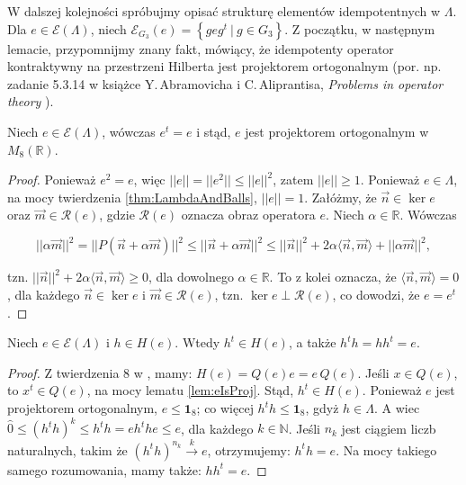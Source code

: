 {W dalszej kolejności spróbujmy opisać strukturę elementów idempotentnych w $\Lambda$.
Dla $e \in \mathcal{E}(\Lambda)$,
niech $\mathcal{E}_{G_{3}}(e) = \left \{ g e g^{t} \: | \: g \in G_{3} \right \}$.
Z początku, w następnym lemacie, przypomnijmy znany fakt,
mówiący, że idempotenty operator kontraktywny na przestrzeni Hilberta
jest projektorem ortogonalnym
(por. np. zadanie 5.3.14 w książce
Y.\,Abramovicha i  C.\,Aliprantisa,
\emph{Problems in operator theory}
\cite{Abramovich2002}).
\begin{Lemma}
    \label{lem:eIsProj}
    Niech $e \in \mathcal{E}(\Lambda)$, wówczas $e^{t} = e$ i stąd,
    $e$ jest projektorem ortogonalnym w $M_{8}(\mathbb{R})$.
\end{Lemma}
\begin{proof}
    Ponieważ $e^{2} = e$, więc $||e|| = ||e^{2}|| \leq ||e||^{2}$,
    zatem $||e|| \geq 1$.
    Ponieważ $e \in \Lambda$, na mocy twierdzenia \ref{thm:LambdaAndBalls},
    $||e|| =1$.
Załóżmy, że $\vec{n} \in \ker e$ oraz $\vec{m} \in \mathcal{R}(e)$,
gdzie $\mathcal{R}(e)$ oznacza obraz operatora $e$.
Niech $\alpha \in \mathbb{R}$.
Wówczas
\begin{linenomath*}
 \begin{equation}
    || \alpha \vec{m} ||^{2} = || P (\vec{n} + \alpha \vec{m}) ||^{2} \leq
    || \vec{n} + \alpha \vec{m}||^{2} \leq ||\vec{n}||^{2} +
        2 \alpha \langle \vec{n}, \vec{m} \rangle + || \alpha \vec{m}||^{2},
 \end{equation}
\end{linenomath*}
tzn. $||\vec{n}||^{2} + 2 \alpha  \langle \vec{n}, \vec{m} \rangle \geq 0$,
dla dowolnego $\alpha \in \mathbb{R}$.
To z kolei oznacza, że
$\langle \vec{n}, \vec{m} \rangle = 0$,
dla każdego  $\vec{n} \in \ker e$ i $\vec{m} \in \mathcal{R}(e)$,
tzn.
$\ker e \perp \mathcal{R}(e)$, co dowodzi, że $e = e^{t}$.
\end{proof}

\begin{Theorem}
\label{prop:htranspose}
Niech $e \in \mathcal{E}(\Lambda)$ i $h \in H(e)$.
Wtedy $h^{t} \in H(e)$, a także $h^{t} h = h h^{t} = e$.
\end{Theorem}
\begin{proof}
    Z twierdzenia 8  w \cite{schwarz1955hausdorff}, mamy:
    $H(e) = Q(e) e = e \, Q(e)$.
Jeśli $x \in Q(e)$, to $x^{t} \in Q(e)$,
na mocy lematu \ref{lem:eIsProj}.
Stąd, $h^{t} \in H(e)$.
Ponieważ $e$ jest projektorem ortogonalnym, $e \leq \mathbf{1}_{8}$;
co więcej $h^{t} h \leq \mathbf{1}_{8}$, gdyż $h \in \Lambda$.
A wiec $\hat{0} \leq (h^{t} h)^{k} \leq h^{t} h = e h^{t} h e \leq e$,
dla każdego $k \in \mathbb{N}$.
Jeśli $n_{k}$ jest ciągiem liczb naturalnych, takim że
    $(h^{t} h)^{n_{k}} \overset{k}{\rightarrow} e$,
otrzymujemy: $h^{t} h = e$.
Na mocy takiego samego rozumowania, mamy także: $h h^{t} = e$.
\end{proof}

}
